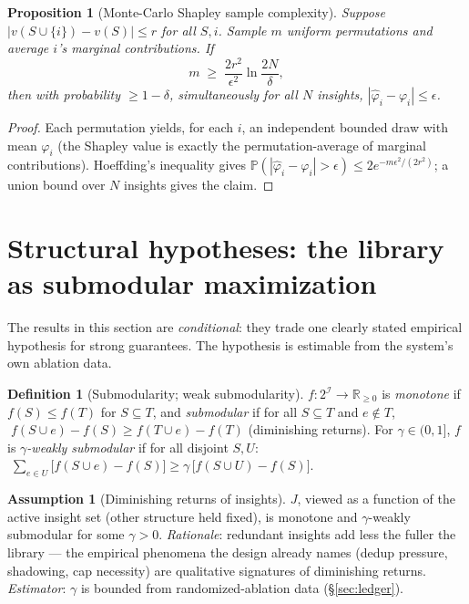 \documentclass[11pt]{article}
\theoremstyle{plain}
\newtheorem{proposition}[theorem]{Proposition}
\theoremstyle{definition}
\newtheorem{definition}[theorem]{Definition}
\newtheorem{assumption}[theorem]{Assumption}
\theoremstyle{remark}
\newcommand{\Prob}{\mathbb{P}}
\newcommand{\R}{\mathbb{R}}
\newcommand{\cI}{\mathcal{I}}
\begin{document}
\begin{proposition}[Monte-Carlo Shapley sample complexity]\label{prop:shapley-mc}
Suppose $|v(S \cup \{i\}) - v(S)| \le r$ for all $S, i$. Sample $m$ uniform
permutations and average $i$'s marginal contributions. If
\[
  m \;\ge\; \frac{2 r^2}{\epsilon^2} \ln\frac{2N}{\delta},
\]
then with probability $\ge 1 - \delta$, simultaneously for all $N$ insights,
$|\hat\varphi_i - \varphi_i| \le \epsilon$.
\end{proposition}

\begin{proof}
Each permutation yields, for each $i$, an independent bounded draw with mean
$\varphi_i$ (the Shapley value is exactly the permutation-average of marginal
contributions). Hoeffding's inequality gives
$\Prob(|\hat\varphi_i - \varphi_i| > \epsilon) \le 2 e^{-m\epsilon^2 /
(2r^2)}$; a union bound over $N$ insights gives the claim.
\end{proof}

\section{Structural hypotheses: the library as submodular maximization}
\label{sec:structure}

The results in this section are \emph{conditional}: they trade one clearly
stated empirical hypothesis for strong guarantees. The hypothesis is
estimable from the system's own ablation data.

\begin{definition}[Submodularity; weak submodularity]
$f : 2^{\cI} \to \R_{\ge0}$ is \emph{monotone} if $f(S) \le f(T)$ for $S
\subseteq T$, and \emph{submodular} if for all $S \subseteq T$ and $e \notin
T$, $\;f(S \cup e) - f(S) \ge f(T \cup e) - f(T)$ (diminishing returns). For
$\gamma \in (0,1]$, $f$ is \emph{$\gamma$-weakly submodular} if for all
disjoint $S, U$:
$\;\sum_{e \in U} \bigl[f(S \cup e) - f(S)\bigr] \ge \gamma\,\bigl[f(S \cup
U) - f(S)\bigr]$.
\end{definition}

\begin{assumption}[Diminishing returns of insights]\label{asm:submod}
$J$, viewed as a function of the active insight set (other structure held
fixed), is monotone and $\gamma$-weakly submodular for some $\gamma > 0$.
\emph{Rationale}: redundant insights add less the fuller the library --- the
empirical phenomena the design already names (dedup pressure, shadowing,
cap necessity) are qualitative signatures of diminishing returns.
\emph{Estimator}: $\gamma$ is bounded from randomized-ablation data
(\S\ref{sec:ledger}).
\end{assumption}
\end{document}
